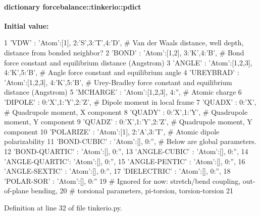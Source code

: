 \hypertarget{namespaceforcebalance_1_1tinkerio_a37b5a9c337cd2791f6d6c00bf295e69c}{
\paragraph[{pdict}]{\setlength{\rightskip}{0pt plus 5cm}dictionary {\bf forcebalance\-::tinkerio\-::pdict}}}\label{namespaceforcebalance_1_1tinkerio_a37b5a9c337cd2791f6d6c00bf295e69c}
{\bfseries \-Initial value\-:}
\begin{DoxyCode}
1 {'VDW'          : {'Atom':[1], 2:'S',3:'T',4:'D'}, # Van der Waals distance,
       well depth, distance from bonded neighbor?
2          'BOND'         : {'Atom':[1,2], 3:'K',4:'B'},     # Bond force
       constant and equilibrium distance (Angstrom)
3          'ANGLE'        : {'Atom':[1,2,3], 4:'K',5:'B'},   # Angle force
       constant and equilibrium angle
4          'UREYBRAD'     : {'Atom':[1,2,3], 4:'K',5:'B'},   # Urey-Bradley force
       constant and equilibrium distance (Angstrom)
5          'MCHARGE'       : {'Atom':[1,2,3], 4:''},          # Atomic charge
6          'DIPOLE'       : {0:'X',1:'Y',2:'Z'},             # Dipole moment in
       local frame
7          'QUADX'        : {0:'X'},                         # Quadrupole moment,
       X component
8          'QUADY'        : {0:'X',1:'Y'},                   # Quadrupole moment,
       Y component
9          'QUADZ'        : {0:'X',1:'Y',2:'Z'},             # Quadrupole moment,
       Y component
10          'POLARIZE'     : {'Atom':[1], 2:'A',3:'T'},       # Atomic dipole
       polarizability
11          'BOND-CUBIC'   : {'Atom':[], 0:''},    # Below are global parameters.
12          'BOND-QUARTIC' : {'Atom':[], 0:''},
13          'ANGLE-CUBIC'  : {'Atom':[], 0:''},
14          'ANGLE-QUARTIC': {'Atom':[], 0:''},
15          'ANGLE-PENTIC' : {'Atom':[], 0:''},
16          'ANGLE-SEXTIC' : {'Atom':[], 0:''},
17          'DIELECTRIC'   : {'Atom':[], 0:''},
18          'POLAR-SOR'    : {'Atom':[], 0:''}
19                                                 # Ignored for now: stretch/bend
       coupling, out-of-plane bending,
20                                                 # torsional parameters,
       pi-torsion, torsion-torsion
21          }
\end{DoxyCode}


\-Definition at line 32 of file tinkerio.\-py.

